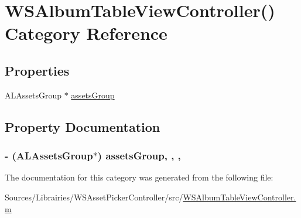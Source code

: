 \hypertarget{category_w_s_album_table_view_controller_07_08}{\section{W\-S\-Album\-Table\-View\-Controller() Category Reference}
\label{category_w_s_album_table_view_controller_07_08}
}
\subsection*{Properties}
\begin{DoxyCompactItemize}
\item 
A\-L\-Assets\-Group $\ast$ \hyperlink{category_w_s_album_table_view_controller_07_08_ac64f4b4e058bca4dd8d711fab3f7a66c}{assets\-Group}
\end{DoxyCompactItemize}


\subsection{Property Documentation}
\hypertarget{category_w_s_album_table_view_controller_07_08_ac64f4b4e058bca4dd8d711fab3f7a66c}{
\subsubsection[{assets\-Group}]{\setlength{\rightskip}{0pt plus 5cm}-\/ (A\-L\-Assets\-Group$\ast$) assets\-Group\hspace{0.3cm}{\ttfamily [read]}, {\ttfamily [write]}, {\ttfamily [nonatomic]}, {\ttfamily [weak]}}}\label{category_w_s_album_table_view_controller_07_08_ac64f4b4e058bca4dd8d711fab3f7a66c}


The documentation for this category was generated from the following file\-:\begin{DoxyCompactItemize}
\item 
Sources/\-Librairies/\-W\-S\-Asset\-Picker\-Controller/src/\hyperlink{_w_s_album_table_view_controller_8m}{W\-S\-Album\-Table\-View\-Controller.\-m}\end{DoxyCompactItemize}
